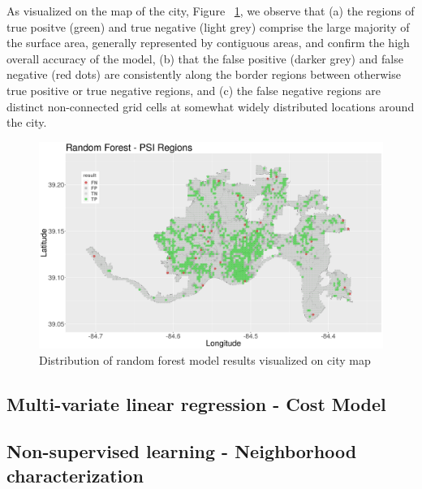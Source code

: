 \documentclass{llncs}
\begin{document}
As visualized on the map of the city, Figure ~\ref{figure : rfbinarymap}, we observe that (a) the regions of true positve (green) and true negative (light grey) comprise the large majority of the surface area, generally represented by contiguous areas, and confirm the high overall accuracy of the model, (b) that the false positive (darker grey) and false negative (red dots) are consistently along the border regions between otherwise true positive or true negative regions, and (c)  the false negative regions are distinct non-connected grid cells at somewhat widely distributed locations around the city.
\newline

\FloatBarrier
\begin{figure}
 	\includegraphics[width=\textwidth, height=\textheight, keepaspectratio]{RFBinaryResultsMap.png}
 	\caption{Distribution of random forest model results visualized on city map}
	\label{figure : rfbinarymap}
\end{figure}
\FloatBarrier

\subsection{Multi-variate linear regression - Cost Model}

\subsection{Non-supervised learning - Neighborhood characterization}
\end{document}
